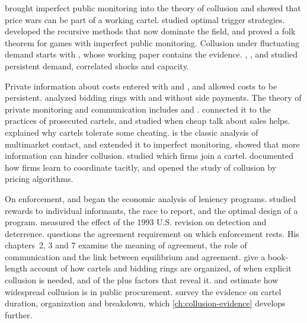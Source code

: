 \citet{GreenPorter1984} brought imperfect public monitoring into the theory of collusion and showed that price wars
can be part of a working cartel. \citet{Porter1983b} studied optimal trigger strategies.
\citet{AbreuPearceStacchetti1986,AbreuPearceStacchetti1990} developed the recursive methods that now dominate the
field, and \citet{FudenbergLevineMaskin1994} proved a folk theorem for games with imperfect public monitoring.
Collusion under fluctuating demand starts with \citet{RotembergSaloner1986}, whose working paper
\citep{RotembergSaloner1984} contains the evidence. \citet{HaltiwangerHarrington1991}, \citet{Kandori1991},
\citet{StaigerWolak1992} and \citet{BagwellStaiger1997} studied persistent demand, correlated shocks and capacity.

Private information about costs entered with \citet{AtheyBagwell2001} and \citet{AtheyBagwellSanchirico2004}, and
\citet{AtheyBagwell2008} allowed costs to be persistent. \citet{McAfeeMcMillan1992} analyzed bidding rings with
and without side payments. The theory of private monitoring and communication includes \citet{Compte1998} and
\citet{KandoriMatsushima1998}. \citet{HarringtonSkrzypacz2007,HarringtonSkrzypacz2011} connected it to the
practices of prosecuted cartels, and \citet{AwayaKrishna2016} studied when cheap talk about sales helps.
\citet{BernheimMadsen2017} explained why cartels tolerate some cheating. \citet{BernheimWhinston1990} is the classic
analysis of multimarket contact, and \citet{Matsushima2001} extended it to imperfect monitoring.
\citet{SugayaWolitzky2018} showed that more information can hinder collusion. \citet{BosHarrington2010} studied which
firms join a cartel. \citet{ByrneDeRoos2019} documented how firms learn to coordinate tacitly, and
\citet{CalvanoEtAl2020} opened the study of collusion by pricing algorithms.

On enforcement, \citet{MottaPolo2003} and \citet{Spagnolo2004} began the economic analysis of leniency programs.
\citet{AubertReyKovacic2006} studied rewards to individual informants, \citet{Harrington2008} the race to report,
and \citet{ChenRey2013} the optimal design of a program. \citet{Miller2009} measured the effect of the 1993 U.S.
revision on detection and deterrence. \citet{Kaplow2013} questions the agreement requirement on which enforcement
rests. His chapters~2, 3 and 7 examine the meaning of agreement, the role of communication and the link between
equilibrium and agreement. \citet{MarshallMarx2012} give a book-length account of how cartels and bidding rings are
organized, of when explicit collusion is needed, and of the plus factors that reveal it. \citet{KawaiNakabayashi2020}
and \citet{ConleyDecarolis2016} estimate how widespread collusion is in public procurement. \citet{LevensteinSuslow2006}
survey the evidence on cartel duration, organization and breakdown, which \cref{ch:collusion-evidence} develops
further.

